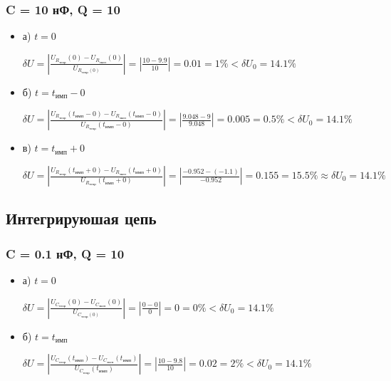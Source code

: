 \documentclass[a4paper,14pt]{extarticle}
\begin{document}
\subsubsection{C = 10 нФ, Q = 10}

\begin{itemize}
	\item[] а) $t = 0$

	$\delta U = \left| \frac{U_{R_\text{теор}}(0) - U_{R_\text{эксп}}(0)}{U_{R_\text{теор}(0)}} \right| = \left| \frac{10 - 9.9}{10} \right| = 0.01 = 1\% < \delta U_0 = 14.1\%$

	\item[] б) $t = t_\text{имп}-0$

	$\delta U = \left| \frac{U_{R_\text{теор}}(t_\text{имп}-0) - U_{R_\text{эксп}}(t_\text{имп}-0)}{U_{R_\text{теор}}(t_\text{имп}-0)} \right| = \left| \frac{9.048 - 9}{9.048} \right| = 0.005 = 0.5\% < \delta U_0 = 14.1\%$

	\item[] в) $t = t_\text{имп}+0$

	$\delta U = \left| \frac{U_{R_\text{теор}}(t_\text{имп}+0) - U_{R_\text{эксп}}(t_\text{имп}+0)}{U_{R_\text{теор}}(t_\text{имп}+0)} \right| = \left| \frac{-0.952 - (-1.1)}{-0.952} \right| = 0.155 = 15.5\% \approx \delta U_0 = 14.1\%$
\end{itemize}

\subsection{Интегрируюшая цепь}

\subsubsection{C = 0.1 нФ, Q = 10}

\begin{itemize}
	\item[] а) $t = 0$

	$\delta U = \left| \frac{U_{C_\text{теор}}(0) - U_{C_\text{эксп}}(0)}{U_{C_\text{теор}(0)}} \right| = \left| \frac{0 - 0}{0} \right| = 0 = 0\% < \delta U_0 = 14.1\%$

	\item[] б) $t = t_\text{имп}$

	$\delta U = \left| \frac{U_{C_\text{теор}}(t_\text{имп}) - U_{C_\text{эксп}}(t_\text{имп})}{U_{C_\text{теор}}(t_\text{имп})} \right| = \left| \frac{10 - 9.8}{10} \right| = 0.02 = 2\% < \delta U_0 = 14.1\%$
\end{itemize}
\end{document}
